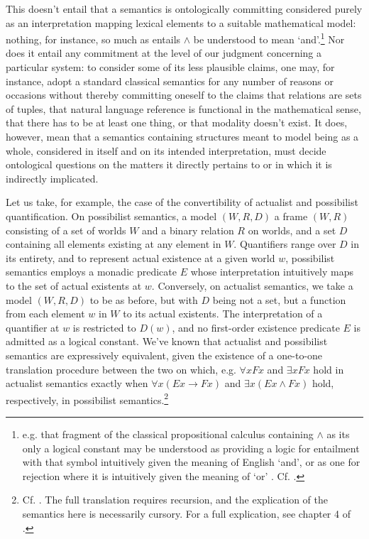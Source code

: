 \documentclass[]{article}
\begin{document}
This doesn't entail that a semantics is ontologically committing considered purely as an interpretation mapping lexical elements to a suitable mathematical model: 
nothing, for instance, so much as entails $\wedge$ be understood to mean `and'.\footnote{
	e.g. that fragment of the classical propositional calculus containing $\wedge$ as its only a logical constant may be understood as providing a logic for entailment with that symbol intuitively given the meaning of English `and', 
	or as one for rejection where it is intuitively given the meaning of `or' . Cf. \autocite[222]{Kripke2015}.}
Nor does it entail any commitment at the level of our judgment concerning a particular system: 
to consider some of its less plausible claims, 
one may, for instance, adopt a standard classical semantics for any number of reasons or occasions without thereby committing oneself to the claims 
that relations are sets of tuples, 
that natural language reference is functional in the mathematical sense, 
that there has to be at least one thing, 
or that modality doesn't exist.
It does, however, mean
that a semantics containing structures meant to model being as a whole, 
considered in itself and on its intended interpretation, 
must decide ontological questions on the matters it directly pertains to or in which it is indirectly implicated. 

Let us take, for example, the case of the convertibility of actualist and possibilist quantification. 
On possibilist semantics, a model $(W, R, D)$ a frame $(W, R)$ 
consisting of a set of worlds $W$ and a binary relation $R$ on worlds, 
and a set $D$ containing all elements existing at any element in $W$. 
Quantifiers range over $D$ in its entirety, and to represent actual existence at a given world $w$, possibilist semantics employs a monadic predicate $E$ 
whose interpretation intuitively maps to the set of actual existents at $w$. 
Conversely, on actualist semantics, 
we take a model $(W, R, D)$ to be as before, 
but with $D$ being not a set, but a function from each element $w$ in $W$ to its actual existents. 
The interpretation of a quantifier at $w$ is restricted to $D(w)$, 
and no first-order existence predicate $E$ is admitted as a logical constant.
We've known that actualist and possibilist semantics are expressively equivalent, 
given the existence of a one-to-one translation procedure between the two on which, e.g. 
$\forall x Fx $ and $\exists x Fx$ hold in actualist semantics 
exactly when $\forall x (Ex \rightarrow Fx)$ and $\exists x(Ex \wedge Fx)$ hold, respectively, in possibilist semantics.\footnote{
	Cf. \autocite{Lejewski1954}. 
	The full translation requires recursion, 
	and the explication of the semantics here is necessarily cursory. 
	For a full explication, see chapter 4 of \autocite{Fitting1998}.}
\end{document}

